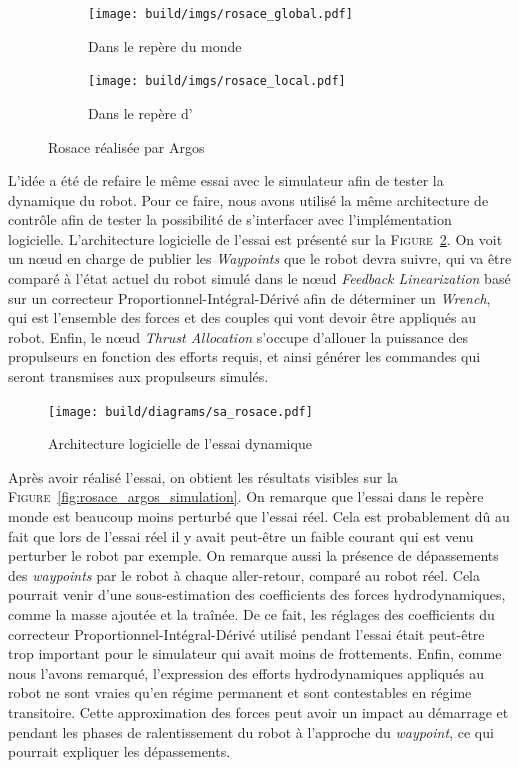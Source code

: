 			\begin{figure}[!htb]
				\centering
				\begin{subfigure}[t]{0.48\textwidth}
					\centering
					\texttt{[image: build/imgs/rosace\_global.pdf]}
					\caption{Dans le repère du monde}
				\end{subfigure}
				\hfill
				\begin{subfigure}[t]{0.48\textwidth}
					\centering
					\texttt{[image: build/imgs/rosace\_local.pdf]}
					\caption{Dans le repère d'\argos{}}
				\end{subfigure}
				\caption{Rosace réalisée par Argos}
				\label{fig:rosace_argos}
			\end{figure}

			L'idée a été de refaire le même essai avec le simulateur afin de tester la dynamique du robot. Pour ce faire, nous avons utilisé la même architecture de contrôle afin de tester la possibilité de s'interfacer avec l'implémentation logicielle. L'architecture logicielle de l'essai est présenté sur la \textsc{Figure}~\ref{fig:sa_rosace}. On voit un n\oe ud en charge de publier les \textit{Waypoints} que le robot devra suivre, qui va être comparé à l'état actuel du robot simulé dans le n\oe ud \textit{Feedback Linearization} basé sur un correcteur Proportionnel-Intégral-Dérivé afin de déterminer un \textit{Wrench}, qui est l'ensemble des forces et des couples qui vont devoir être appliqués au robot. Enfin, le n\oe ud \textit{Thrust Allocation} s'occupe d'allouer la puissance des propulseurs en fonction des efforts requis, et ainsi générer les commandes qui seront transmises aux propulseurs simulés.

			\begin{figure}[!htb]
				\centering
				\texttt{[image: build/diagrams/sa\_rosace.pdf]}
				\caption{Architecture logicielle de l'essai dynamique}
				\label{fig:sa_rosace}
			\end{figure}

			Après avoir réalisé l'essai, on obtient les résultats visibles sur la \textsc{Figure}~\ref{fig:rosace_argos_simulation}. On remarque que l'essai dans le repère monde est beaucoup moins perturbé que l'essai réel. Cela est probablement dû au fait que lors de l'essai réel il y avait peut-être un faible courant qui est venu perturber le robot par exemple. On remarque aussi la présence de dépassements des \textit{waypoints} par le robot à chaque aller-retour, comparé au robot réel. Cela pourrait venir d'une sous-estimation des coefficients des forces hydrodynamiques, comme la masse ajoutée et la traînée. De ce fait, les réglages des coefficients du correcteur Proportionnel-Intégral-Dérivé utilisé pendant l'essai était peut-être trop important pour le simulateur qui avait moins de frottements. Enfin, comme nous l'avons remarqué, l'expression des efforts hydrodynamiques appliqués au robot ne sont vraies qu'en régime permanent et sont contestables en régime transitoire. Cette approximation des forces peut avoir un impact au démarrage et pendant les phases de ralentissement du robot à l'approche du \textit{waypoint}, ce qui pourrait expliquer les dépassements.

